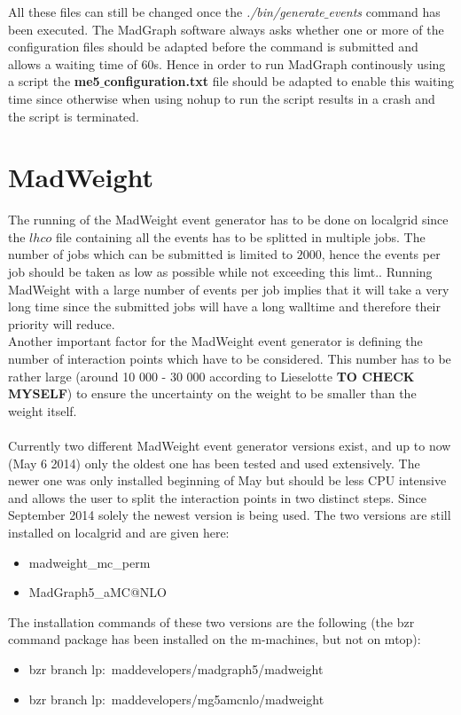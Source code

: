 All these files can still be changed once the \textit{./bin/generate$\_$events} command has been executed. The MadGraph software always asks whether one or more of the configuration files should be adapted before the command is submitted and allows a waiting time of 60s. Hence in order to run MadGraph continously using a script the \textbf{me5$\_$configuration.txt} file should be adapted to enable this waiting time since otherwise when using nohup to run the script results in a crash and the script is terminated.

\section{MadWeight}

The running of the MadWeight event generator has to be done on localgrid since the $lhco$ file containing all the events has to be splitted in multiple jobs. The number of jobs which can be submitted is limited to $2000$, hence the events per job should be taken as low as possible while not exceeding this limt.. Running MadWeight with a large number of events per job implies that it will take a very long time since the submitted jobs will have a long walltime and therefore their priority will reduce. \\
Another important factor for the MadWeight event generator is defining the number of interaction points which have to be considered. This number has to be rather large (around 10 000 - 30 000 according to Lieselotte \textbf{TO CHECK MYSELF}) to ensure the uncertainty on the weight to be smaller than the weight itself.\\
\\
Currently two different MadWeight event generator versions exist, and up to now (May 6 2014) only the oldest one has been tested and used extensively. The newer one was only installed beginning of May but should be less CPU intensive and allows the user to split the interaction points in two distinct steps. Since September 2014 solely the newest version is being used. The two versions are still installed on localgrid and are given here:
\begin{itemize}
  \item madweight\_mc\_perm
  \item MadGraph5\_aMC@NLO
\end{itemize}

The installation commands of these two versions are the following (the bzr command package has been installed on the m-machines, but not on mtop):
\begin{itemize}
  \item bzr branch lp:~maddevelopers/madgraph5/madweight 
  \item bzr branch lp:~maddevelopers/mg5amcnlo/madweight
\end{itemize}

